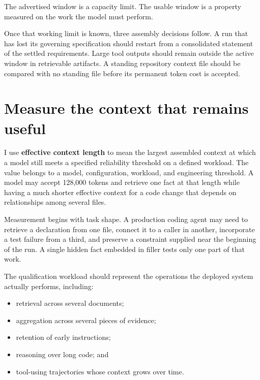 The advertised window is a capacity limit. The usable window is a property measured on the work the model must perform.

Once that working limit is known, three assembly decisions follow. A run that has lost its governing specification should restart from a consolidated statement of the settled requirements. Large tool outputs should remain outside the active window in retrievable artifacts. A standing repository context file should be compared with no standing file before its permanent token cost is accepted.

\hypertarget{measure-the-context-that-remains-useful}{%
\section{Measure the context that remains useful}\label{measure-the-context-that-remains-useful}}

I use \textbf{effective context length} to mean the largest assembled context at which a model still meets a specified reliability threshold on a defined workload. The value belongs to a model, configuration, workload, and engineering threshold. A model may accept 128,000 tokens and retrieve one fact at that length while having a much shorter effective context for a code change that depends on relationships among several files.

Measurement begins with task shape. A production coding agent may need to retrieve a declaration from one file, connect it to a caller in another, incorporate a test failure from a third, and preserve a constraint supplied near the beginning of the run. A single hidden fact embedded in filler tests only one part of that work.


The qualification workload should represent the operations the deployed system actually performs, including:

\begin{itemize}
\tightlist
\item
  retrieval across several documents;
\item
  aggregation across several pieces of evidence;
\item
  retention of early instructions;
\item
  reasoning over long code; and
\item
  tool-using trajectories whose context grows over time.
\end{itemize}


